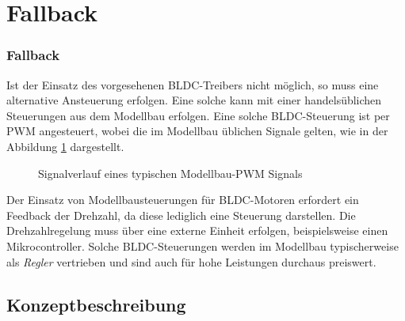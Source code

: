 \ifSTANDALONE
\section{Fallback}
\fi
\ifEMBED
\subsubsection{Fallback}
\fi
Ist der Einsatz des vorgesehenen BLDC-Treibers nicht möglich, so muss eine
alternative Ansteuerung erfolgen. Eine solche kann mit einer handelsüblichen
Steuerungen aus dem Modellbau erfolgen. Eine solche BLDC-Steuerung ist per
PWM angesteuert, wobei die im Modellbau üblichen Signale gelten, wie in der
Abbildung \ref{fig:rc-pwm} dargestellt.

\begin{figure}[h!]
	\centering
	\caption{Signalverlauf eines typischen Modellbau-PWM Signals}
	\label{fig:rc-pwm}
\end{figure}

Der Einsatz von Modellbausteuerungen für BLDC-Motoren erfordert ein
Feedback der Drehzahl, da diese lediglich eine Steuerung darstellen. Die
Drehzahlregelung muss über eine externe Einheit erfolgen, beispielsweise einen
Mikrocontroller. Solche BLDC-Steuerungen werden im Modellbau typischerweise als
\emph{Regler} vertrieben und sind auch für hohe Leistungen durchaus preiswert.

\ifSTANDALONE
\subsection{Konzeptbeschreibung}
\fi
\ifEMBED
